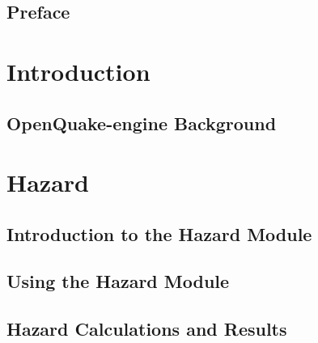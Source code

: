 \documentclass[11pt,fleqn]{book} %
\begin{document}
\chapter*{Preface}



\part{Introduction}
\label{part:introduction}
\chapter{OpenQuake-engine Background}
	

\thispagestyle{empty}
\part{Hazard}

\chapter{Introduction to the Hazard Module}
   \label{chap:hazintro}
	
   \cleardoublepage

\chapter{Using the Hazard Module}
	\label{chap:hazinputs}
	
   \cleardoublepage

\chapter{Hazard Calculations and Results}
	\label{chap:hazoutputs}
	
   \cleardoublepage
\end{document}
